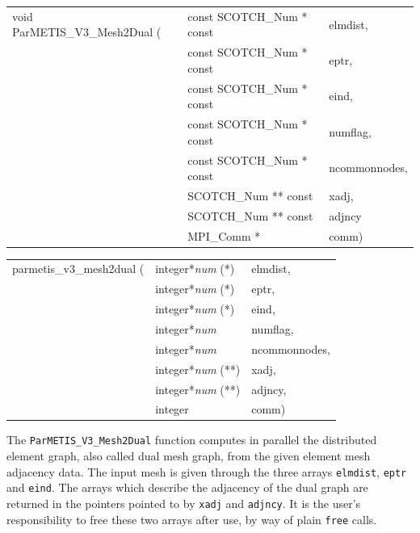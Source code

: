 \begin{itemize}
\progsyn

{\tt\begin{tabular}{l@{}ll}
void ParMETIS\_V3\_Mesh2Dual ( & const SCOTCH\_Num * const & elmdist, \\
                               & const SCOTCH\_Num * const & eptr, \\
                               & const SCOTCH\_Num * const & eind, \\
                               & const SCOTCH\_Num * const & numflag, \\
                               & const SCOTCH\_Num * const & ncommonnodes, \\
                               & SCOTCH\_Num ** const      & xadj, \\
                               & SCOTCH\_Num ** const      & adjncy \\
                               & MPI\_Comm *               & comm)
\end{tabular}}

{\tt\begin{tabular}{l@{}ll}
parmetis\_v3\_mesh2dual ( & integer*{\it num} (*)  & elmdist, \\
                          & integer*{\it num} (*)  & eptr, \\
                          & integer*{\it num} (*)  & eind, \\
                          & integer*{\it num}      & numflag, \\
                          & integer*{\it num}      & ncommonnodes, \\
                          & integer*{\it num} (**) & xadj, \\
                          & integer*{\it num} (**) & adjncy, \\
                          & integer                & comm)
\end{tabular}}

\progdes

The \texttt{ParMETIS\_V3\_Mesh2Dual} function computes in parallel the
distributed element graph, also called dual mesh graph, from the given
element mesh adjacency data. The input mesh is given through the three
arrays \texttt{elmdist}, \texttt{eptr} and \texttt{eind}. The arrays
which describe the adjacency of the dual graph are returned in the
pointers pointed to by \texttt{xadj} and \texttt{adjncy}. It is the
user's responsibility to free these two arrays after use, by way of
plain \texttt{free} calls.
\end{itemize}

